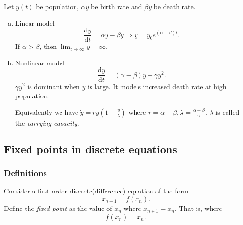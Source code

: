 \documentclass[a4paper]{article}
\begin{document}
    \begin{example}
        Let $ y(t) $ be population, $ \alpha y $ be birth rate and $ \beta y $ be death rate.
        \begin{enumerate}[(a)]
            \item Linear model
            \[
                \frac{\mathrm{d}y}{\mathrm{d}t}=\alpha y-\beta y \Rightarrow y=y_{0}e^{(\alpha-\beta)t} 
            .\]
            If $ \alpha>\beta $, then $ \lim_{t \to \infty} y=\infty  $.
            \item Nonlinear model 
            \[
                \frac{\mathrm{d}y}{\mathrm{d}t} =(\alpha-\beta)y-\gamma y^2
            .\]
            $ \gamma y^2 $ is dominant when $y$ is large. It models increased death rate at high population.

            Equivalently we have $  \dot{y}=ry(1-\frac{y}{\lambda}) $ where $ r=\alpha-\beta, \lambda=\frac{\alpha-\beta}{\gamma} $. $ \lambda $ is called the \textit{carrying capacity}.
            \begin{center}
              \end{center}
        \end{enumerate}
    \end{example}
    \subsection{Fixed points in discrete equations}
    \subsubsection{Definitions}
    Consider a first order discrete(difference) equation of the form 
    \[
        x_{n+1}=f(x_n)
    .\]
    Define the \textit{fixed point} as the value of $x_n$ where $ x_{n+1}=x_n $. That is, where
    \[
        f(x_n)=x_n
    .\]
\end{document}
